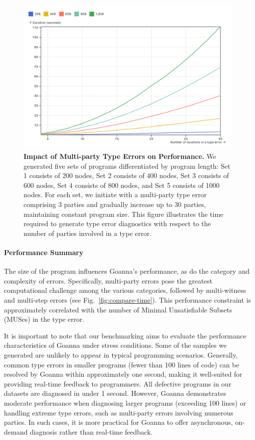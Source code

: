 \documentclass[pdflatex,lineno,sn-nature,Numbered]{sn-jnl}%
\begin{document}
\begin{figure}[ht]
    \centering
    \includegraphics[width=0.8\linewidth]{images/multi-party-time.png}
    \caption{{\bf Impact of Multi-party Type Errors on Performance.} We generated five sets of programs differentiated by program length: Set 1 consists of 200 nodes, Set 2 consists of 400 nodes, Set 3 consists of 600 nodes, Set 4 consists of 800 nodes, and Set 5 consists of 1000 nodes. For each set, we initiate with a multi-party type error comprising 3 parties and gradually increase up to 30 parties, maintaining constant program size. This figure illustrates the time required to generate type error diagnostics with respect to the number of parties involved in a type error. }
    
    \label{fig:multi-party-time}
\end{figure}

\paragraph{Performance Summary}
The size of the program influences Goanna's performance, as do the category and complexity of errors. Specifically, multi-party errors pose the greatest computational challenge among the various categories, followed by multi-witness and multi-step errors (see Fig.~\ref{fig:compare-time}). This performance constraint is approximately correlated with the number of Minimal Unsatisfiable Subsets (MUSes) in the type error.

It is important to note that our benchmarking aims to evaluate the performance characteristics of Goanna under stress conditions. Some of the samples we generated are unlikely to appear in typical programming scenarios. Generally, common type errors in smaller programs (fewer than 100 lines of code) can be resolved by Goanna within approximately one second, making it well-suited for providing real-time feedback to programmers. All defective programs in our datasets are diagnosed in under 1 second. However, Goanna demonstrates moderate performance when diagnosing larger programs (exceeding 100 lines) or handling extreme type errors, such as multi-party errors involving numerous parties. In such cases, it is more practical for Goanna to offer asynchronous, on-demand diagnosis rather than real-time feedback.
\end{document}
